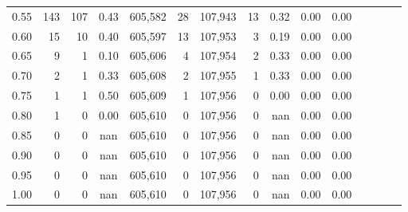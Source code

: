 \begin{tabular}{rrrcrrrrrrrrrrr}
0.55 &      143 &     107 &                                       0.43 &  605,582 &       28 &  107,943 &       13 &  0.32 &  0.00 &                         0.00 \\
0.60 &       15 &      10 &                                       0.40 &  605,597 &       13 &  107,953 &        3 &  0.19 &  0.00 &                         0.00 \\
0.65 &        9 &       1 &                                       0.10 &  605,606 &        4 &  107,954 &        2 &  0.33 &  0.00 &                         0.00 \\
0.70 &        2 &       1 &                                       0.33 &  605,608 &        2 &  107,955 &        1 &  0.33 &  0.00 &                         0.00 \\
0.75 &        1 &       1 &                                       0.50 &  605,609 &        1 &  107,956 &        0 &  0.00 &  0.00 &                         0.00 \\
0.80 &        1 &       0 &                                       0.00 &  605,610 &        0 &  107,956 &        0 &   nan &  0.00 &                         0.00 \\
0.85 &        0 &       0 &                                        nan &  605,610 &        0 &  107,956 &        0 &   nan &  0.00 &                         0.00 \\
0.90 &        0 &       0 &                                        nan &  605,610 &        0 &  107,956 &        0 &   nan &  0.00 &                         0.00 \\
0.95 &        0 &       0 &                                        nan &  605,610 &        0 &  107,956 &        0 &   nan &  0.00 &                         0.00 \\
1.00 &        0 &       0 &                                        nan &  605,610 &        0 &  107,956 &        0 &   nan &  0.00 &                         0.00 \\
\bottomrule
\end{tabular}
